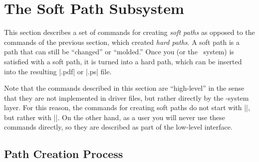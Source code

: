 %
%
%



\section{The Soft Path Subsystem}

\label{section-soft-paths}

\makeatletter


This section describes a set of commands for creating \emph{soft
  paths} as opposed to the commands of the previous section, which
created \emph{hard paths}. A soft path is a path that can still be
``changed'' or ``molded.'' Once you (or the \pgfname\ system) is
satisfied with a soft path, it is turned into a hard path, which can
be inserted into the resulting |.pdf| or |.ps| file.

Note that the commands described in this section are ``high-level'' in
the sense that they are not implemented in driver files, but rather
directly by the \pgfname-system layer. For this reason, the commands for
creating soft paths do not start with |\pgfsys@|, but rather with
|\pgfsyssoftpath@|. On the other hand, as a user you will never use
these commands directly, so they are described as part of the
low-level interface. 



\subsection{Path Creation Process}

